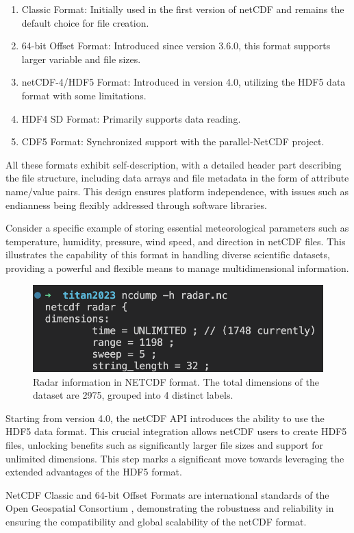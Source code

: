 \begin{enumerate}
    \item Classic Format: Initially used in the first version of netCDF and remains the default choice for file creation.
    \item 64-bit Offset Format: Introduced since version 3.6.0, this format supports larger variable and file sizes.
    \item netCDF-4/HDF5 Format: Introduced in version 4.0, utilizing the HDF5 data format with some limitations.
    \item HDF4 SD Format: Primarily supports data reading.
    \item CDF5 Format: Synchronized support with the parallel-NetCDF project.
\end{enumerate}

All these formats exhibit self-description, with a detailed header part describing the file structure, including data arrays and file metadata in the form of attribute name/value pairs. This design ensures platform independence, with issues such as endianness being flexibly addressed through software libraries.

Consider a specific example of storing essential meteorological parameters such as temperature, humidity, pressure, wind speed, and direction in netCDF files. This illustrates the capability of this format in handling diverse scientific datasets, providing a powerful and flexible means to manage multidimensional information.

\begin{figure}[H]
    \centering
    \includegraphics[width=1\linewidth]{Images/ncdump.png}
    \vspace{1em}
    \caption{Radar information in NETCDF format. The total dimensions of the dataset are 2975, grouped into 4 distinct labels.}
    \label{fig:enter-label}
\end{figure}

Starting from version 4.0, the netCDF API introduces the ability to use the HDF5 data format.
This crucial integration allows netCDF users to create HDF5 files, unlocking benefits such as significantly larger file sizes and support for unlimited dimensions.
This step marks a significant move towards leveraging the extended advantages of the HDF5 format.

NetCDF Classic and 64-bit Offset Formats are international standards of the Open Geospatial Consortium \cite{ogcnetcdf}, demonstrating the robustness and reliability in ensuring the compatibility and global scalability of the netCDF format.
